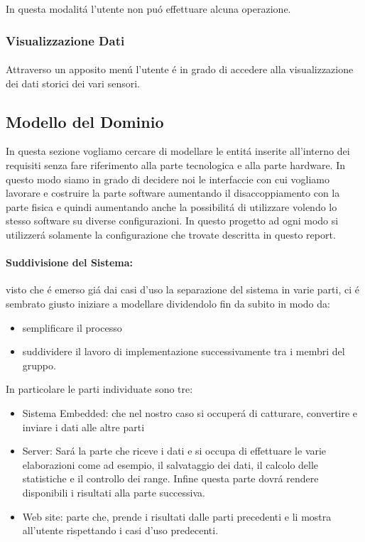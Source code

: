 In questa modalit\'a l'utente non pu\'o effettuare alcuna operazione.

\subsubsection{Visualizzazione Dati}

\paragraph{} Attraverso un apposito men\'u l'utente \'e in grado di accedere alla visualizzazione dei dati storici dei vari sensori.

\subsection{Modello del Dominio}

In questa sezione vogliamo cercare di modellare le entit\'a inserite all'interno dei requisiti senza fare riferimento alla parte tecnologica e alla parte hardware. In questo modo siamo in grado di decidere noi le interfaccie con cui vogliamo lavorare e costruire la parte software aumentando il disaccoppiamento con la parte fisica e quindi aumentando anche la possibilit\'a di utilizzare volendo lo stesso software su diverse configurazioni. In questo progetto ad ogni modo si utilizzer\'a solamente la configurazione che trovate descritta in questo report.

\paragraph{Suddivisione del Sistema:} visto che \'e emerso gi\'a dai casi d'uso la separazione del sistema in varie parti, ci \'e sembrato giusto iniziare a modellare dividendolo fin da subito in modo da:
\begin{itemize}
  \item semplificare il processo
  \item suddividere il lavoro di implementazione successivamente tra i membri del gruppo.
\end{itemize}

In particolare le parti individuate sono tre:

\begin{itemize}
  \item Sistema Embedded: che nel nostro caso si occuper\'a di catturare, convertire e inviare i dati alle altre parti
  \item Server: Sar\'a la parte che riceve i dati e si occupa di effettuare le varie elaborazioni come ad esempio, il salvataggio dei dati, il calcolo delle statistiche e il controllo dei range. Infine questa parte dovr\'a rendere disponibili i risultati alla parte successiva.
  \item Web site: parte che, prende i risultati dalle parti precedenti e li mostra all'utente rispettando i casi d'uso predecenti.
\end{itemize}

